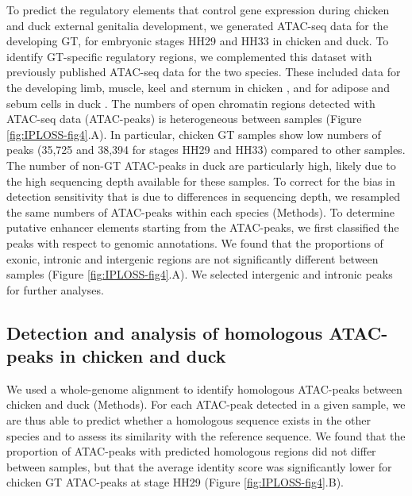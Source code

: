 To predict the regulatory elements that control gene expression during chicken and duck external genitalia development, we generated ATAC-seq data for the developing GT, for embryonic stages HH29 and HH33 in chicken and duck. To identify GT-specific regulatory regions, we complemented this dataset with previously published ATAC-seq data for the two species. These included data for the developing limb, muscle, keel and sternum in chicken \citep{sackton_convergent_2019}, and for adipose and sebum cells in duck \citep{zhu_three_2021}. The numbers of open chromatin regions detected with ATAC-seq data (ATAC-peaks) is heterogeneous between samples (Figure \ref{fig:IPLOSS-fig4}.A). In particular, chicken GT samples show low numbers of peaks (35,725 and 38,394 for stages HH29 and HH33) compared to other samples. The number of non-GT ATAC-peaks in duck are particularly high, likely due to the high sequencing depth available for these samples. To correct for the bias in detection sensitivity that is due to differences in sequencing depth, we resampled the same numbers of ATAC-peaks within each species (Methods). 
To determine putative enhancer elements starting from the ATAC-peaks, we first classified the peaks with respect to genomic annotations. We found that the proportions of exonic, intronic and intergenic regions are not significantly different between samples (Figure \ref{fig:IPLOSS-fig4}.A). We selected intergenic and intronic peaks for further analyses. \\



\subsection{Detection and analysis of homologous ATAC-peaks in chicken and duck}

We used a whole-genome alignment to identify homologous ATAC-peaks between chicken and duck (Methods). For each ATAC-peak detected in a given sample, we are thus able to predict whether a homologous sequence exists in the other species and to assess its similarity with the reference sequence. We found that the proportion of ATAC-peaks with predicted homologous regions did not differ between samples, but that the average identity score was significantly lower for chicken GT ATAC-peaks at stage HH29 (Figure \ref{fig:IPLOSS-fig4}.B). \\

